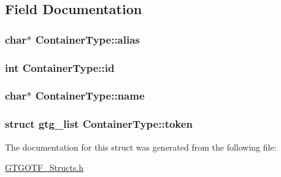 \subsection{Field Documentation}
\hypertarget{structContainerType_a85ebdaf602c61a46cc07a505a16e6e33}{
\subsubsection[{alias}]{\setlength{\rightskip}{0pt plus 5cm}char$\ast$ Container\-Type\-::alias}}\label{structContainerType_a85ebdaf602c61a46cc07a505a16e6e33}
\hypertarget{structContainerType_a02fb15eb66f37f3e1086f2ee0fb281fb}{
\subsubsection[{id}]{\setlength{\rightskip}{0pt plus 5cm}int Container\-Type\-::id}}\label{structContainerType_a02fb15eb66f37f3e1086f2ee0fb281fb}
\hypertarget{structContainerType_a8bf2b33a4144adf9d82b347b510e205c}{
\subsubsection[{name}]{\setlength{\rightskip}{0pt plus 5cm}char$\ast$ Container\-Type\-::name}}\label{structContainerType_a8bf2b33a4144adf9d82b347b510e205c}
\hypertarget{structContainerType_a478bcc47be0ccd30b8e3627119cc3c82}{
\subsubsection[{token}]{\setlength{\rightskip}{0pt plus 5cm}struct {\bf gtg\-\_\-list} Container\-Type\-::token}}\label{structContainerType_a478bcc47be0ccd30b8e3627119cc3c82}


The documentation for this struct was generated from the following file\-:\begin{DoxyCompactItemize}
\item 
\hyperlink{GTGOTF__Structs_8h}{G\-T\-G\-O\-T\-F\-\_\-\-Structs.\-h}\end{DoxyCompactItemize}
